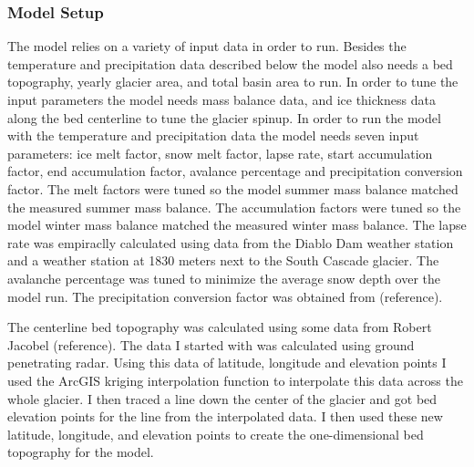 \documentclass{article}
\begin{document}
\subsubsection{Model Setup}
The model relies on a variety of input data in order to run. Besides the temperature and precipitation data described below the model also 
needs a bed topography, yearly glacier area, and total basin area to run. In order to tune the input parameters the model needs mass balance 
data, and ice thickness data along the bed centerline to tune the glacier spinup. In order to run the model with the temperature and 
precipitation data the model needs seven input parameters: ice melt factor, snow melt factor, lapse rate, start accumulation factor, end 
accumulation factor, avalance percentage and precipitation conversion factor. The melt factors were tuned so the model summer mass balance 
matched the measured summer mass balance. The accumulation factors were tuned so the model winter mass balance matched the measured winter 
mass balance. The lapse rate was empiraclly calculated using data from the Diablo Dam weather station and a weather station at 1830 meters 
next to the South Cascade glacier. The avalanche percentage was tuned to minimize the average snow depth over the model run. The precipitation 
conversion factor was obtained from (reference).

The centerline bed topography was calculated using some data from Robert Jacobel (reference). The data I started with was calculated using 
ground penetrating radar. Using this data of latitude, longitude and elevation points I used the ArcGIS kriging interpolation function to 
interpolate this data across the whole glacier. I then traced a line down the center of the glacier and got bed elevation points for the line 
from the interpolated data. I then used these new latitude, longitude, and elevation points to create the one-dimensional bed topography for 
the model.
\end{document}
